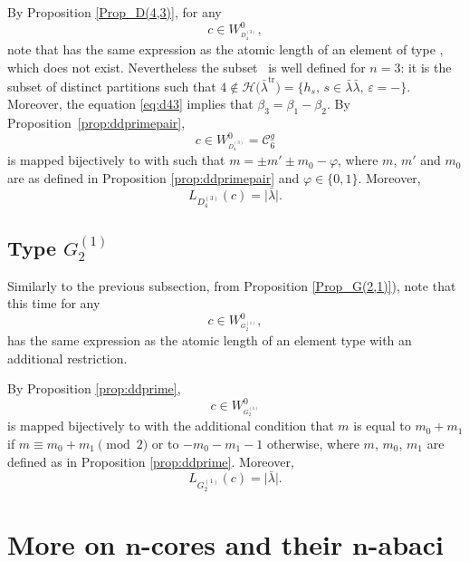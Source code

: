 \documentclass[pdftex]{sigma}
\numberwithin{equation}{section}
\newcommand{\cC}{\mathcal{C}}
\def\cch{\mathcal H}
\begin{document}
By Proposition \ref{Prop_D(4,3)}, for any
\[
c\in W_{^{D_{4}^{(3)}}}^{0},
\]
 note that  has the same expression as the atom\-ic length of an element of type , which does not exist. Nevertheless the subset~\smash{$\cC_{2n-2}^{d,\mathrm{tr}}$}
is well defined for $n=3$: it is the subset of distinct partitions such that
$4\not\in \cch\bigl(\bar{\lambda}^{\mathrm{tr}}\bigr)=\{h_{s},\,{s\in \bar{\lambda}\bar{\lambda}},\,{\varepsilon =-}\}$.
	Moreover, the equation \eqref{eq:d43} implies that $\beta_3=\beta_1-\beta_2$.
	By Proposition~\ref{prop:ddprimepair},
\[
c\in W_{^{D_{4}^{(3)}}}^{0}=\mathcal{C}_{6}^{g}
\]
 is mapped bijectively to
	\smash{$\bar{\lambda}\in\cC_{4}^{d,\mathrm{tr}}$} with  such that $m=\pm m'\pm m_0-\varphi$, where $m$, $m'$ and $m_0$ are as defined in Proposition \ref{prop:ddprimepair} and $\varphi\in\lbrace 0,1\rbrace$. Moreover,
\begin{equation*}
L_{D_{4}^{(3)}}(c)=\bigl\lvert \bar{\lambda}\bigr\rvert.
\end{equation*}

\subsection[Type G\_2\^{}(1)]{Type $G_{2}^{(1)}$}

Similarly to the previous subsection, from Proposition \ref{Prop_G(2,1)}), note that this time for any
\[
c\in W_{^{G_{2}^{(1)}}}^{0},
\]
 has the same expression as the atomic length of an element type  with an additional restriction.

By Proposition \ref{prop:ddprime},
\[
c\in W_{^{G_{2}^{(1)}}}^{0}
\] is mapped bijectively to  with the additional condition that $m$ is equal to $m_0+m_1$ if $m\equiv m_0+m_1 \pmod{2}$ or to $-m_0-m_1-1$ otherwise, where $m$, $m_0$, $m_1$ are defined as in Proposition \ref{prop:ddprime}. Moreover,
\begin{equation*}
L_{G_{2}^{(1)}}(c)=\bigl\lvert \bar{\lambda}\bigr\rvert.
\end{equation*}


\section[More on n-cores and their n-abaci]{More on $\boldsymbol{n}$-cores and their $\boldsymbol{n}$-abaci}\label{sec:abacus}
\end{document}
